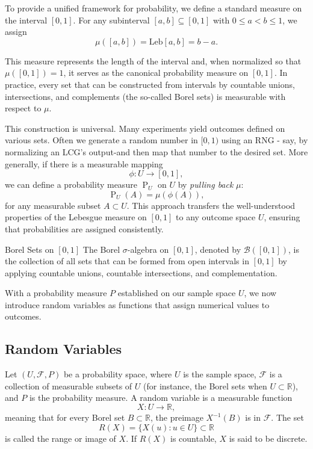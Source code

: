 \documentclass[10pt, headings=standardclasses, parskip=half, twoside]{scrartcl}
\begin{document}
To provide a unified framework for probability, we define a standard measure on the interval $[0,1]$. 
For any subinterval $[a, b] \subseteq[0,1]$ with $0 \leq a<b \leq 1$, we assign
\[
\mu([a, b]) = \text{Leb}[a, b] = b - a .
\]

This measure represents the length of the interval and, when normalized so that $\mu([0,1])=1$, it serves as the canonical probability measure on $[0,1]$. 
In practice, every set that can be constructed from intervals by countable unions, intersections, and complements (the so-called Borel sets) is measurable with respect to $\mu$.

This construction is universal. Many experiments yield outcomes defined on various sets.
Often we generate a random number in $[0,1)$ using an RNG - say, by normalizing an LCG's output-and then map that number to the desired set. 
More generally, if there is a measurable mapping
\[
\phi: U \rightarrow[0,1],
\]
we can define a probability measure $\operatorname{P}_{U}$ on $U$ by \textit{pulling back} $\mu$:
\[
\operatorname{P}_{U}(A)=\mu(\phi(A)),
\]
for any measurable subset $A \subset U$. 
This approach transfers the well-understood properties of the Lebesgue measure on $[0,1]$ to any outcome space $U$, ensuring that probabilities are assigned consistently.

\begin{definition}{Borel Sets on $[0,1]$}{}
The Borel $\sigma$-algebra on $[0,1]$, denoted by $\mathcal{B}([0,1])$, is the collection of all sets that can be formed from open intervals in $[0,1]$ by applying countable unions, countable intersections, and complementation.
\end{definition}

With a probability measure $P$ established on our sample space $U$, we now introduce random variables as functions that assign numerical values to outcomes.


\subsection{Random Variables}

\begin{definition}{}
    Let $(U, \mathcal{F}, P)$ be a probability space, where $U$ is the sample space, $\mathcal{F}$ is a collection of measurable subsets of $U$ (for instance, the Borel sets when $U \subset \mathbb{R}$), and $P$ is the probability measure. 
    A random variable is a measurable function
    \[
    X: U \rightarrow \mathbb{R},
    \]
    meaning that for every Borel set $B \subset \mathbb{R}$, the preimage $X^{-1}(B)$ is in $\mathcal{F}$.
    The set
    \[
    R(X)=\{X(u): u \in U\} \subset \mathbb{R}
    \]
    is called the range or image of $X$.
    If $R(X)$ is countable, $X$ is said to be discrete.
\end{definition}
\end{document}
